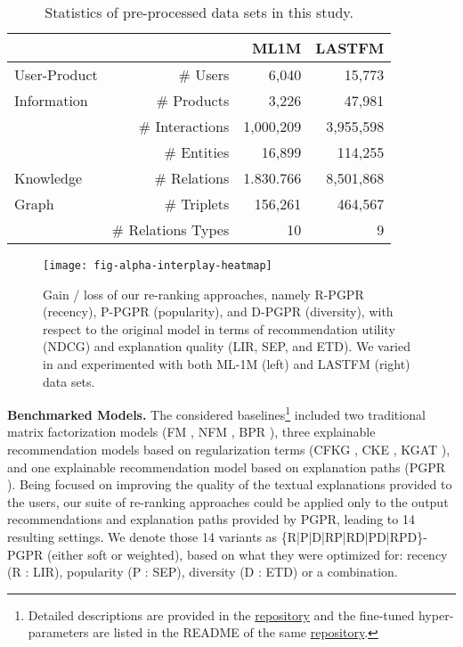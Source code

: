 \documentclass[sigconf]{acmart}
\begin{document}
\begin{table}[!t]
  \caption{Statistics of pre-processed data sets in this study.}
  \label{tab:data-stats}
  \begin{tabular}{lrrr}
    \newline & \newline & \textbf{ML1M} & \textbf{LASTFM} \\
    \hline
    \toprule
    User-Product & \# Users & 6,040 & 15,773 \\
    Information & \# Products & 3,226 & 47,981 \\
    \newline & \# Interactions & 1,000,209 & 3,955,598 \\
    \hline
    \newline & \# Entities & 16,899 & 114,255 \\
    Knowledge & \# Relations & 1.830.766 & 8,501,868 \\
    Graph & \# Triplets & 156,261 & 464,567 \\
    \newline & \# Relations Types & 10 & 9 \\
    \bottomrule
  \end{tabular}
\end{table}

\begin{figure}[!t]
\centering
\texttt{[image: fig-alpha-interplay-heatmap]}
\caption{{\color{black}Gain / loss of our re-ranking approaches, namely R-PGPR (recency), P-PGPR (popularity), and D-PGPR (diversity), with respect to the original model} in terms of recommendation utility (NDCG) and explanation quality (LIR, SEP, and ETD). We varied  in  and experimented with both ML-1M (left) and LASTFM (right) data sets.}
\label{fig:satt-sopt}
\end{figure}

\vspace{2mm}\noindent\textbf{Benchmarked Models.} 
The considered baselines\footnote{Detailed descriptions are provided in the \href{https://tinyurl.com/tkm87t4s}{repository} and the fine-tuned hyper-parameters are listed in the README of the same \href{https://tinyurl.com/tkm87t4s}{repository}.} included two traditional matrix factorization models (FM \cite{10.1145/2009916.2010002}, NFM \cite{DBLP:conf/uai/RendleFGS09}, BPR \cite{DBLP:conf/uai/RendleFGS09}), three explainable recommendation models based on regularization terms (CFKG \cite{AiACZ18}, CKE \cite{CKE10.1145/2939672.2939673}, KGAT \cite{Wang00LC19}), and one explainable recommendation model based on explanation paths (PGPR \cite{XianFMMZ19}).
Being focused on improving the quality of the textual explanations provided to the users, our suite of re-ranking approaches could be applied only to the output recommendations and explanation paths provided by PGPR, leading to 14 resulting settings.  
We denote those 14 variants as \{R|P|D|RP|RD|PD|RPD\}-PGPR (either soft or weighted), based on what they were optimized for: recency (R : LIR), popularity (P : SEP), diversity (D : ETD) or a combination. 
\end{document}
